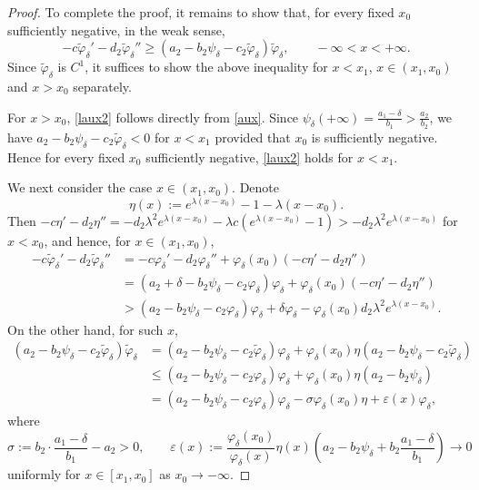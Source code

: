 \documentclass[reqno]{amsart}
\theoremstyle{plain}
\theoremstyle{definition}
\theoremstyle{remark}
\begin{document}
\begin{proof}
		To complete the proof, it remains to show that, for every fixed $x_0$ sufficiently negative, in the weak sense,
		\begin{equation}\label{laux2}
			-c\tilde{\varphi}_\delta' - d_2 \tilde{\varphi}_\delta'' \ge (a_2 - b_2\psi_\delta - c_2\tilde{\varphi}_\delta) \tilde{\varphi}_\delta, \qquad -\infty < x < +\infty.
		\end{equation}
		Since $\tilde{\varphi}_{\delta}$ is $C^1$, it suffices to show the above inequality for $x<x_1$, $x\in(x_1,x_0)$ and $x>x_0$ separately.
		
		For $x>x_0$, \eqref{laux2} follows directly from \eqref{aux}. Since $\psi_\delta(+\infty)=\frac{a_1 - \delta}{b_1}>\frac{a_2}{b_2}$, we have
		$a_2 - b_2\psi_\delta - c_2\tilde{\varphi}_\delta<0$ for $x<x_1$ provided that $x_0$ is sufficiently negative. Hence for every fixed $x_0$ sufficiently negative, \eqref{laux2} holds for $x<x_1$.
		
		We next consider the case $x\in(x_1,x_0)$. Denote
		\[
		\eta(x) := e^{\lambda(x-x_0)} - 1 - \lambda(x-x_0).
		\]
		Then $-c\eta' - d_2\eta'' = -d_2\lambda^2 e^{\lambda(x-x_0)} - \lambda c \left(e^{\lambda(x-x_0)} - 1\right) > -d_2\lambda^2 e^{\lambda(x-x_0)}$ for $x<x_0$, and hence, for $x\in(x_1,x_0)$,
		\[
		\begin{aligned}
			-c\tilde{\varphi}_\delta' - d_2 \tilde{\varphi}_\delta'' &= -c {\varphi}_\delta' - d_2 {\varphi}_\delta'' + \varphi_{\delta}(x_0)(-c\eta' - d_2\eta'') \\
			&= (a_2 + \delta - b_2\psi_\delta - c_2\varphi_\delta)\varphi_\delta + \varphi_{\delta}(x_0)(-c\eta' - d_2\eta'') \\
			&> (a_2 - b_2\psi_\delta - c_2\varphi_\delta)\varphi_\delta + \delta\varphi_{\delta} - \varphi_{\delta}(x_0)d_2 \lambda^2 e^{\lambda(x-x_0)}.
		\end{aligned}
		\]
		On the other hand, for such $x$,
		\begin{align*}
			(a_2 - b_2\psi_\delta - c_2\tilde{\varphi}_\delta) \tilde{\varphi}_\delta &= (a_2 - b_2\psi_\delta - c_2\tilde{\varphi}_\delta)\varphi_\delta + \varphi_{\delta}(x_0)\eta (a_2 - b_2\psi_\delta - c_2\tilde{\varphi}_\delta)\\
			&\le (a_2 - b_2\psi_\delta - c_2 {\varphi}_\delta)\varphi_\delta + \varphi_{\delta}(x_0)\eta (a_2 - b_2\psi_\delta)\\
			&= (a_2 - b_2\psi_\delta - c_2 {\varphi}_\delta)\varphi_\delta - \sigma \varphi_{\delta}(x_0)\eta + \varepsilon(x)\varphi_{\delta},
		\end{align*}
		where
		\[
		\sigma := b_2\cdot\frac{a_1 - \delta}{b_1} - a_2 > 0,\qquad
		\varepsilon(x) := \frac{\varphi_{\delta}(x_0)}{\varphi_{\delta}(x)}\eta(x)\left(a_2 - b_2\psi_\delta + b_2\frac{a_1 - \delta}{b_1}\right) \to 0
		\]
		uniformly for $x\in[x_1,x_0]$ as $x_0\to-\infty$.
		

\end{proof}
\end{document}
